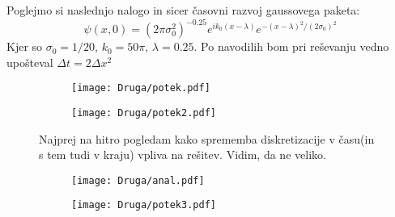 \documentclass{article}
\begin{document}
\newpage
Poglejmo si naslednjo nalogo in sicer časovni razvoj gaussovega paketa:
\begin{equation*}
\psi(x,0) = (2\pi \sigma_0^2)^{-0.25} e^{i k_0 (x-\lambda)} e^{-(x-\lambda)^2/(2 \sigma_0)^2}
\end{equation*}
Kjer so $\sigma_0 = 1/20$, $k_0 = 50\pi$, $\lambda = 0.25$. 
Po navodilih bom pri reševanju vedno upošteval $\Delta t = 2 \Delta x^2$

\begin{figure}[H]
\begin{subfigure}{.5\textwidth}
\texttt{[image: Druga/potek.pdf]}
\end{subfigure}
\begin{subfigure}{.5\textwidth}
\texttt{[image: Druga/potek2.pdf]}
\end{subfigure}
\caption*{Najprej na hitro pogledam kako sprememba diskretizacije v času(in s tem tudi v kraju) vpliva na rešitev. Vidim, da ne veliko.}
\end{figure}

\begin{figure}[H]
\begin{subfigure}{.5\textwidth}
\texttt{[image: Druga/anal.pdf]}
\end{subfigure}
\begin{subfigure}{.5\textwidth}
\texttt{[image: Druga/potek3.pdf]}
\end{subfigure}
\end{figure}
\end{document}
